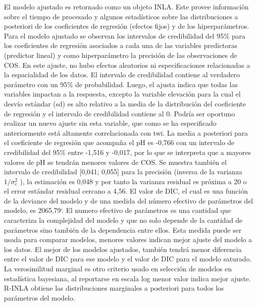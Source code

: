 \documentclass[11pt,b5paper,]{krantz}
\begin{document}
El modelo ajustado es retornado como un objeto INLA. Este provee información sobre el tiempo de procesado y algunos estadísticos sobre las distribuciones a posteriori de los coeficientes de regresión (efectos fijos) y de los hiperparámetros. Para el modelo ajustado se observan los intervalos de credibilidad del 95\% para los coeficientes de regresión asociados a cada una de las variables predictoras (predictor lineal) y como hiperparámetro la precisión de las observaciones de COS. En este ajuste, no hubo efectos aleatorios ni especificaciones relacionadas a la espacialidad de los datos.
El intervalo de credibilidad contiene al verdadero parámetro con un 95\% de probabilidad. Luego, el ajusta indica que todas las variables impactan a la respuesta, excepto la variable elevación para la cual el desvío estándar (sd) es alto relativo a la media de la distribución del coeficiente de regresión y el intervalo de credibilidad contiene al 0. Podría ser oportuno realizar un nuevo ajuste sin esta variable, que como se ha especificado anteriormente está altamente correlacionada con twi. La media a posteriori para el coeficiente de regresión que acompaña el pH es -0,766 con un intervalo de credibilidad del 95\% entre -1,516 y -0,017, por lo que se interpreta que a mayores valores de pH se tendrán menores valores de COS. Se muestra también el intervalo de credibilidad {[}0,041; 0,055{]} para la precisión (inversa de la varianza \(1/\sigma_e^2\) ), la estimación es 0,048 y por tanto la varianza residual es próxima a 20 o el error estándar residual cercano a 4,56. El valor de DIC, el cual es una función de la deviance del modelo y de una medida del número efectivo de parámetros del modelo, es 2065,79`. El numero efectivo de parámetros es una cantidad que caracteriza la complejidad del modelo y que no solo depende de la cantidad de parámetros sino también de la dependencia entre ellos. Esta medida puede ser usada para comparar modelos, menores valores indican mejor ajuste del modelo a los datos. El mejor de los modelos ajustados, también tendrá menor diferencia entre el valor de DIC para ese modelo y el valor de DIC para el modelo saturado. La verosimilitud marginal es otro criterio usado en selección de modelos en estadística bayesiana, al reportarse en escala log menor valor indica mejor ajuste. R-INLA obtiene las distribuciones marginales a posteriori para todos los parámetros del modelo.
\end{document}
